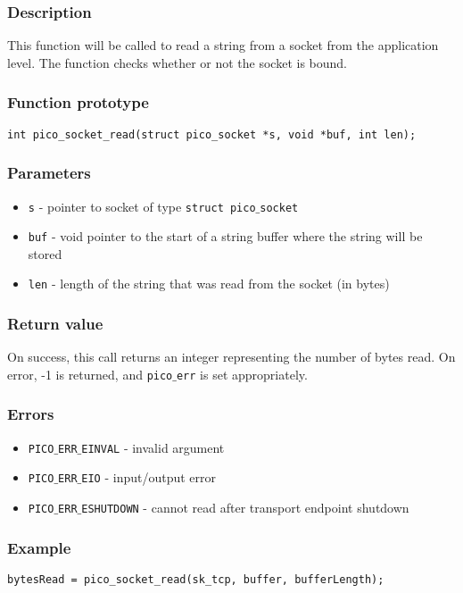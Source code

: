 \subsubsection*{Description}
This function will be called to read a string from a socket from the application level. The function checks whether or not the socket is bound.

\subsubsection*{Function prototype}
\begin{verbatim}
int pico_socket_read(struct pico_socket *s, void *buf, int len);
\end{verbatim}

\subsubsection*{Parameters}
\begin{itemize}[noitemsep]
\item \texttt{s} - pointer to socket of type \texttt{struct pico$\_$socket}
\item \texttt{buf} - void pointer to the start of a string buffer where the string will be stored
\item \texttt{len} - length of the string that was read from the socket (in bytes)
\end{itemize}

\subsubsection*{Return value}
On success, this call returns an integer representing the number of bytes read.
On error, -1 is returned, and \texttt{pico$\_$err} is set appropriately.

\subsubsection*{Errors}
\begin{itemize}[noitemsep]
\item \texttt{PICO$\_$ERR$\_$EINVAL} - invalid argument
\item \texttt{PICO$\_$ERR$\_$EIO} - input/output error
\item \texttt{PICO$\_$ERR$\_$ESHUTDOWN} - cannot read after transport endpoint shutdown
\end{itemize}

\subsubsection*{Example}
\begin{verbatim}
bytesRead = pico_socket_read(sk_tcp, buffer, bufferLength);
\end{verbatim}



